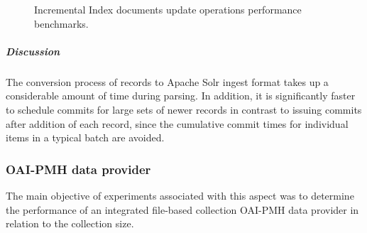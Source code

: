 \tablespacing

\bodyspacing


\begin{figure}
 \centering
 \framebox[\textwidth]{%

 }
 \caption[Impact of batch size on indexing performance]{Incremental Index documents update operations performance benchmarks.}
 \label{fig:experimentation:performance:indexing:incremental-indexing}
\end{figure}

\subparagraph{Discussion}

The conversion process of records to Apache Solr ingest format takes up a considerable amount of time during parsing. In addition, it is significantly faster to schedule commits for large sets of newer records in contrast to issuing commits after addition of each record, since the cumulative commit times for individual items in a typical batch are avoided.




\subsubsection[OAI-PMH]{OAI-PMH data provider}
\label{sec:evaluation:performance:oaipmh-data-provider}

The main objective of experiments associated with this aspect was to determine
the performance of an integrated file-based collection OAI-PMH data provider in
relation to the collection size.

